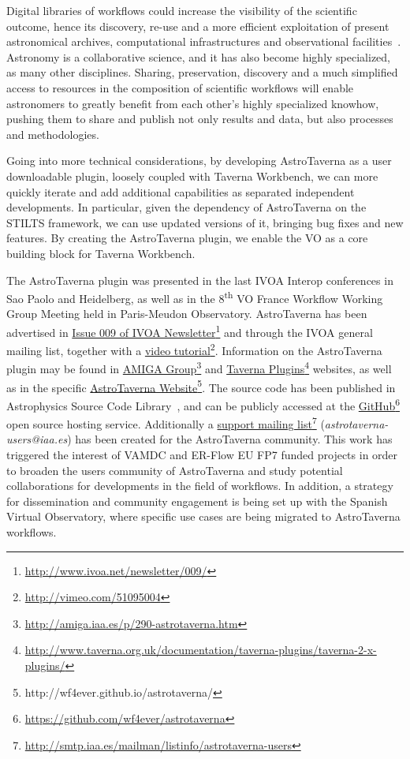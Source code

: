\documentclass{aa}
\newcommand{\urlsamefont}[1]{\urlstyle{same}\url{#1}}
\newcommand{\hrefnote}[2]{\href{#1}{#2}\footnote{\urlsamefont{#1}}}
\begin{document}
Digital libraries of workflows could increase the visibility of the scientific outcome, hence its discovery, re-use and a more efficient exploitation of present astronomical archives, computational infrastructures and observational facilities~\citep{Ruiz2012}. Astronomy is a collaborative science, and it has also become highly specialized, as many other disciplines. Sharing, preservation, discovery and a much simplified access to resources in the composition of scientific workflows will enable astronomers to greatly benefit from each other’s highly specialized knowhow, pushing them to share and publish not only results and data, but also processes and methodologies.

Going into more technical considerations, by developing AstroTaverna as a user downloadable plugin, loosely coupled with Taverna Workbench, we can more quickly iterate and add additional capabilities as separated independent developments. In particular, given the dependency of AstroTaverna on the STILTS framework, we can use updated versions of it, bringing bug fixes and new features. By creating the AstroTaverna plugin, we enable the VO as a core building block for Taverna Workbench.

The AstroTaverna plugin was presented in the last IVOA Interop conferences in Sao Paolo and Heidelberg, as well as in the 8\textsuperscript{th} VO France Workflow Working Group Meeting held in Paris-Meudon Observatory. AstroTaverna has been advertised in \hrefnote{http://www.ivoa.net/newsletter/009/}{Issue 009 of IVOA Newsletter} and through the IVOA general mailing list, together with a \hrefnote{http://vimeo.com/51095004}{video tutorial}. Information on the AstroTaverna plugin may be found in \hrefnote{http://amiga.iaa.es/p/290-astrotaverna.htm}{AMIGA Group} and \hrefnote{http://www.taverna.org.uk/documentation/taverna-plugins/taverna-2-x-plugins/}{Taverna Plugins} websites, as well as in the specific \href{http://wf4ever.github.io/astrotaverna/}{AstroTaverna Website}\footnote{\label{website}http://wf4ever.github.io/astrotaverna/}. The source code has been published in Astrophysics Source Code Library~\citep[ASCL; see][]{Garrido2013}, and can be publicly accessed at the \hrefnote{https://github.com/wf4ever/astrotaverna}{GitHub} open source hosting service. Additionally a \hrefnote{http://smtp.iaa.es/mailman/listinfo/astrotaverna-users}{support mailing list} (\textit{astrotaverna-users@iaa.es}) has been created for the AstroTaverna community.  This work has triggered the interest of VAMDC and ER-Flow EU FP7 funded projects in order to broaden the users community of AstroTaverna and study potential collaborations for developments in the field of workflows. In addition, a strategy for dissemination and community engagement is being set up with the Spanish Virtual Observatory, where specific use cases are being migrated to AstroTaverna workflows.  
\end{document}
